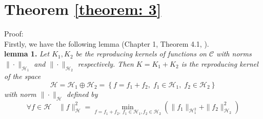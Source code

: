 \section{Theorem \ref{theorem: 3}}
\label{proof 3}
Proof: \\
Firstly, we have the following lemma (Chapter 1, Theorem 4.1, \cite{RKHS book}).\\
\textbf{lemma 1.}
\emph{
    Let $K_1, K_2$ be the reproducing kernels of functions on $\mathcal{C}$ with
    norms $\|\cdot\|_{\mathcal{H}_1}$ and $\|\cdot\|_{\mathcal{H}_2}$ respectively. Then $K=K_1+K_2$ is
    the reproducing kernel of the space 
    $$
        \mathcal{H} = \mathcal{H}_1\oplus \mathcal{H}_2 =
        \left\{ 
            f = f_1 + f_2, \; f_1\in \mathcal{H}_1, \; f_2\in\mathcal{H}_2
        \right\}
    $$
    with norm $\|\cdot\|_\mathcal{H}$ defined by 
    $$
        \forall f\in \mathcal{H} \quad \|f\|_{\mathcal{H}}^2 
        = \min_{
                f=f_1+f_2,\; 
                f_1\in \mathcal{H}_1, f_2\in \mathcal{H}_2
        }
        \left(\|f_1\|_{\mathcal{H}_1^2} + \|f_2\|_{\mathcal{H}_2}^2\right)
    $$
}

